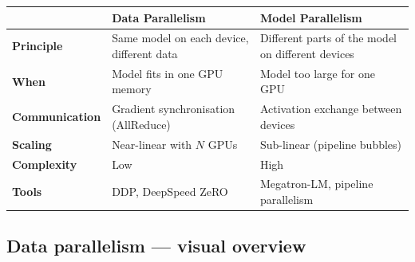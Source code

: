 \begin{center}
\begin{tabular}{@{}lp{5.5cm}p{5.5cm}@{}}
\toprule
& \textbf{Data Parallelism} & \textbf{Model Parallelism} \\
\midrule
\textbf{Principle} & Same model on each device, different data &
  Different parts of the model on different devices \\
\textbf{When} & Model fits in one GPU memory &
  Model too large for one GPU \\
\textbf{Communication} & Gradient synchronisation (AllReduce) &
  Activation exchange between devices \\
\textbf{Scaling} & Near-linear with $N$ GPUs &
  Sub-linear (pipeline bubbles) \\
\textbf{Complexity} & Low & High \\
\textbf{Tools} & DDP, DeepSpeed ZeRO & Megatron-LM, pipeline parallelism \\
\bottomrule
\end{tabular}
\end{center}

\subsection{Data parallelism --- visual overview}

